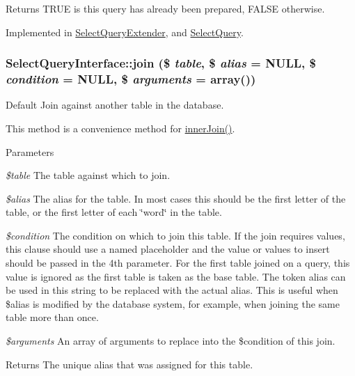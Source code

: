 \begin{DoxyReturn}{Returns}
TRUE is this query has already been prepared, FALSE otherwise. 
\end{DoxyReturn}


Implemented in \hyperlink{classSelectQueryExtender_a693e855f00c67fe6281c64cf0339c8ee}{SelectQueryExtender}, and \hyperlink{classSelectQuery_a12d7cb534e4178f404286468f4ad3321}{SelectQuery}.\hypertarget{interfaceSelectQueryInterface_a596614bc76873c1487f87d30f892a651}{
\subsubsection[{join}]{\setlength{\rightskip}{0pt plus 5cm}SelectQueryInterface::join (\$ {\em table}, \/  \$ {\em alias} = {\ttfamily NULL}, \/  \$ {\em condition} = {\ttfamily NULL}, \/  \$ {\em arguments} = {\ttfamily array()})}}
\label{interfaceSelectQueryInterface_a596614bc76873c1487f87d30f892a651}
Default Join against another table in the database.

This method is a convenience method for \hyperlink{interfaceSelectQueryInterface_ab359fd116625504a297d7fd4222f2564}{innerJoin()}.


\begin{DoxyParams}{Parameters}
\item[{\em \$table}]The table against which to join. \item[{\em \$alias}]The alias for the table. In most cases this should be the first letter of the table, or the first letter of each \char`\"{}word\char`\"{} in the table. \item[{\em \$condition}]The condition on which to join this table. If the join requires values, this clause should use a named placeholder and the value or values to insert should be passed in the 4th parameter. For the first table joined on a query, this value is ignored as the first table is taken as the base table. The token alias can be used in this string to be replaced with the actual alias. This is useful when \$alias is modified by the database system, for example, when joining the same table more than once. \item[{\em \$arguments}]An array of arguments to replace into the \$condition of this join. \end{DoxyParams}
\begin{DoxyReturn}{Returns}
The unique alias that was assigned for this table. 
\end{DoxyReturn}


